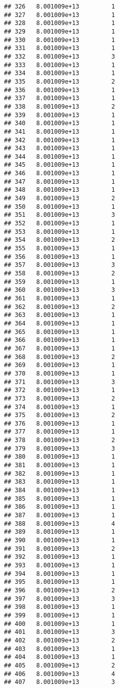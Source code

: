 \documentclass[
]{article}
\begin{document}
\begin{verbatim}
## 326   8.001009e+13         1
## 327   8.001009e+13         1
## 328   8.001009e+13         1
## 329   8.001009e+13         1
## 330   8.001009e+13         1
## 331   8.001009e+13         1
## 332   8.001009e+13         3
## 333   8.001009e+13         1
## 334   8.001009e+13         1
## 335   8.001009e+13         2
## 336   8.001009e+13         1
## 337   8.001009e+13         1
## 338   8.001009e+13         2
## 339   8.001009e+13         1
## 340   8.001009e+13         1
## 341   8.001009e+13         1
## 342   8.001009e+13         1
## 343   8.001009e+13         1
## 344   8.001009e+13         1
## 345   8.001009e+13         1
## 346   8.001009e+13         1
## 347   8.001009e+13         1
## 348   8.001009e+13         1
## 349   8.001009e+13         2
## 350   8.001009e+13         1
## 351   8.001009e+13         3
## 352   8.001009e+13         1
## 353   8.001009e+13         1
## 354   8.001009e+13         2
## 355   8.001009e+13         1
## 356   8.001009e+13         1
## 357   8.001009e+13         3
## 358   8.001009e+13         2
## 359   8.001009e+13         1
## 360   8.001009e+13         3
## 361   8.001009e+13         1
## 362   8.001009e+13         2
## 363   8.001009e+13         1
## 364   8.001009e+13         1
## 365   8.001009e+13         1
## 366   8.001009e+13         1
## 367   8.001009e+13         1
## 368   8.001009e+13         2
## 369   8.001009e+13         1
## 370   8.001009e+13         1
## 371   8.001009e+13         3
## 372   8.001009e+13         1
## 373   8.001009e+13         2
## 374   8.001009e+13         1
## 375   8.001009e+13         2
## 376   8.001009e+13         1
## 377   8.001009e+13         1
## 378   8.001009e+13         2
## 379   8.001009e+13         3
## 380   8.001009e+13         1
## 381   8.001009e+13         1
## 382   8.001009e+13         1
## 383   8.001009e+13         1
## 384   8.001009e+13         1
## 385   8.001009e+13         1
## 386   8.001009e+13         1
## 387   8.001009e+13         1
## 388   8.001009e+13         4
## 389   8.001009e+13         1
## 390   8.001009e+13         1
## 391   8.001009e+13         2
## 392   8.001009e+13         1
## 393   8.001009e+13         1
## 394   8.001009e+13         1
## 395   8.001009e+13         1
## 396   8.001009e+13         2
## 397   8.001009e+13         3
## 398   8.001009e+13         1
## 399   8.001009e+13         1
## 400   8.001009e+13         1
## 401   8.001009e+13         3
## 402   8.001009e+13         2
## 403   8.001009e+13         1
## 404   8.001009e+13         1
## 405   8.001009e+13         2
## 406   8.001009e+13         4
## 407   8.001009e+13         3

\end{verbatim}
\end{document}
